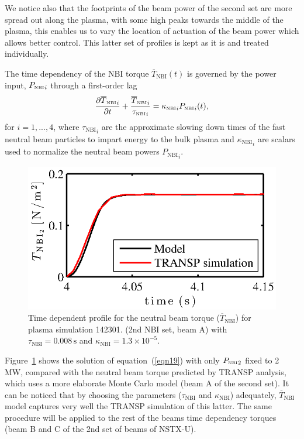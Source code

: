 \documentclass[12pt,lot, lof]{puthesis}
\begin{document}
We notice also that the footprints of the beam power of the second set are more spread out along the plasma,  with some high peaks towards the middle of the plasma, this enables us to vary the location of actuation of the beam power which allows better control. This latter set of profiles is kept as it is and treated individually.

The time dependency of the NBI torque $\overline{T}_\text{NBI}(t)$ is governed by the power input, $ {P_\textrm{\tiny{NBI}}}_i$ through a first-order lag
 \begin{equation}
\frac{{\partial \overline{T}_\textrm{\tiny{NBI}}}_i}{\partial t}
+ \frac{{\overline{T}_\textrm{\tiny{NBI}}}_i}{{\tau_\textrm{\tiny{NBI}}}_i}  = {\kappa_\textrm{\tiny{NBI}}}_i {P_\textrm{\tiny{NBI}}}_i(t), \label{eqn19}
\end{equation}
for $i=1,...,4$, where ${\tau_\text{NBI}}_i$ are the approximate slowing down times of the fast neutral beam particles to impart energy to the bulk plasma and ${\kappa_\text{NBI}}_i$ are scalars used to normalize the neutral beam powers ${P_\text{NBI}}_i$.
%
\begin{figure} 
\centering
\includegraphics [width=0.8 \linewidth]{chap10/fig5} 
\caption{Time dependent profile for the neutral beam torque ($ \overline{T}_\text{NBI} $) for
  plasma simulation 142301. (2nd NBI set, beam A) with $\tau_\text{NBI} = 0.008\,\text{s}$ and  $\kappa_\text{NBI} =
  1.3\times10^{-5}$.}
\label{NBI2}
\end{figure}

Figure~\ref{NBI2} shows the solution of equation~(\ref{eqn19}) with only $ {P_\textrm{\tiny{NBI}}}_2$ fixed to 2 MW, compared with the neutral beam torque predicted by TRANSP analysis, which uses a more elaborate Monte Carlo model (beam A of the second set). It can be noticed that by choosing the parameters ($\tau_\text{NBI}$ and $\kappa_\text{NBI}$) adequately, $ \overline{T}_\text{NBI} $ model captures very well the TRANSP simulation of this latter. The same procedure will be applied to the rest of the beams time dependency torques (beam B and C of the 2nd set of beams of NSTX-U).
\end{document}
